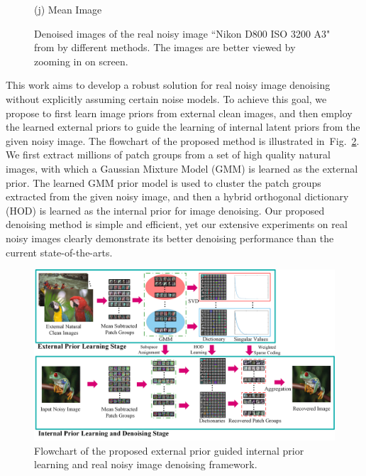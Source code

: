\documentclass[10pt,twocolumn,letterpaper]{article}
\begin{document}
\begin{figure}
{\begin{minipage}[t]{0.195\textwidth}
{\footnotesize (j) Mean Image \cite{crosschannel2016} }
\end{minipage}
}\vspace{-1mm}
\caption{Denoised images of the real noisy image ``Nikon D800 ISO 3200 A3" from \cite{crosschannel2016} by different methods. The images are better viewed by zooming in on screen.} 
\vspace{-3mm}
\label{fig1}
\end{figure}

This work aims to develop a robust solution for real noisy image denoising without explicitly assuming certain noise models. To achieve this goal, we propose to first learn image priors from external clean images, and then employ the learned external priors to guide the learning of internal latent priors from the given noisy image. The flowchart of the proposed method is illustrated in\ Fig.\ \ref{fig2}. We first extract millions of patch groups from a set of high quality natural images, with which a Gaussian Mixture Model (GMM) is learned as the external prior. The learned GMM prior model is used to cluster the patch groups extracted from the given noisy image, and then a hybrid orthogonal dictionary (HOD) is learned as the internal prior for image denoising. Our proposed denoising method is simple and efficient, yet our extensive experiments on real noisy images clearly demonstrate its better denoising performance than the current state-of-the-arts.

\begin{figure}\vspace{-0.1in}
\centering
\includegraphics[width=0.85\linewidth]{Flowchart3.png}
\vspace{-2mm}
\caption{Flowchart of the proposed external prior guided internal prior learning and real noisy image denoising framework.
}
\vspace{-3mm}
\label{fig2}
\end{figure}
\end{document}
